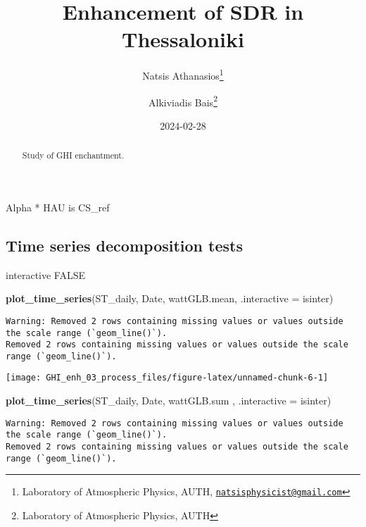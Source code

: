 \documentclass[
  10pt,
  a4paper,oneside]{article}
\title{Enhancement of SDR in Thessaloniki}
\author{Natsis Athanasios\footnote{Laboratory of Atmospheric Physics, AUTH, \href{mailto:natsisphysicist@gmail.com}{\nolinkurl{natsisphysicist@gmail.com}}} \and Alkiviadis Bais\footnote{Laboratory of Atmospheric Physics, AUTH}}
\date{2024-02-28}
\newenvironment{Shaded}{\begin{snugshade}}{\end{snugshade}}
\newcommand{\AttributeTok}[1]{\textcolor[rgb]{0.13,0.29,0.53}{#1}}
\newcommand{\FunctionTok}[1]{\textcolor[rgb]{0.13,0.29,0.53}{\textbf{#1}}}
\newcommand{\NormalTok}[1]{#1}
\begin{document}
\maketitle
\begin{abstract}
Study of GHI enchantment.
\end{abstract}

{
\hypersetup{linkcolor=}
\setcounter{tocdepth}{4}
\tableofcontents
}
Alpha * HAU is CS\_ref

\hypertarget{time-series-decomposition-tests}{%
\subsection{Time series decomposition tests}\label{time-series-decomposition-tests}}

interactive FALSE

\begin{Shaded}
\begin{Highlighting}[]
\FunctionTok{plot\_time\_series}\NormalTok{(ST\_daily, Date, wattGLB.mean, }\AttributeTok{.interactive =}\NormalTok{ isinter)}
\end{Highlighting}
\end{Shaded}

\begin{verbatim}
Warning: Removed 2 rows containing missing values or values outside the scale range (`geom_line()`).
Removed 2 rows containing missing values or values outside the scale range (`geom_line()`).
\end{verbatim}

\begin{center}\texttt{[image: GHI\_enh\_03\_process\_files/figure-latex/unnamed-chunk-6-1]} \end{center}

\begin{Shaded}
\begin{Highlighting}[]
\FunctionTok{plot\_time\_series}\NormalTok{(ST\_daily, Date, wattGLB.sum , }\AttributeTok{.interactive =}\NormalTok{ isinter)}
\end{Highlighting}
\end{Shaded}

\begin{verbatim}
Warning: Removed 2 rows containing missing values or values outside the scale range (`geom_line()`).
Removed 2 rows containing missing values or values outside the scale range (`geom_line()`).
\end{verbatim}
\end{document}
